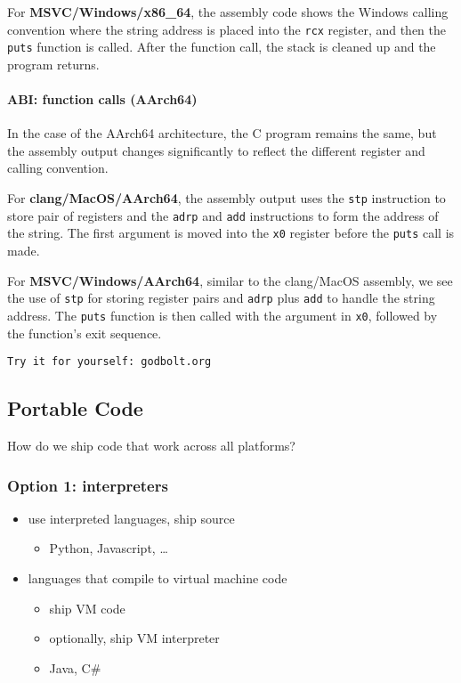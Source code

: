 \documentclass[12pt]{article}
\begin{document}
For \textbf{MSVC/Windows/x86\_64}, the assembly code shows the Windows calling convention where the string address is placed into the \texttt{rcx} register, and then the \texttt{puts} function is called. After the function call, the stack is cleaned up and the program returns.

\paragraph{ABI: function calls (AArch64)}

In the case of the AArch64 architecture, the C program remains the same, but the assembly output changes significantly to reflect the different register and calling convention.

For \textbf{clang/MacOS/AArch64}, the assembly output uses the \texttt{stp} instruction to store pair of registers and the \texttt{adrp} and \texttt{add} instructions to form the address of the string. The first argument is moved into the \texttt{x0} register before the \texttt{puts} call is made.

For \textbf{MSVC/Windows/AArch64}, similar to the clang/MacOS assembly, we see the use of \texttt{stp} for storing register pairs and \texttt{adrp} plus \texttt{add} to handle the string address. The \texttt{puts} function is then called with the argument in \texttt{x0}, followed by the function's exit sequence.

\texttt{Try it for yourself: godbolt.org}

\subsection{Portable Code}

How do we ship code that work across all platforms?


\subsubsection{Option 1: interpreters}
\begin{itemize}
  \item use interpreted languages, ship source
  \begin{itemize}
    \item Python, Javascript, \ldots
  \end{itemize}
  \item languages that compile to virtual machine code
  \begin{itemize}
    \item ship VM code
    \item optionally, ship VM interpreter
    \item Java, C\#
  \end{itemize}
\end{itemize}
\end{document}
